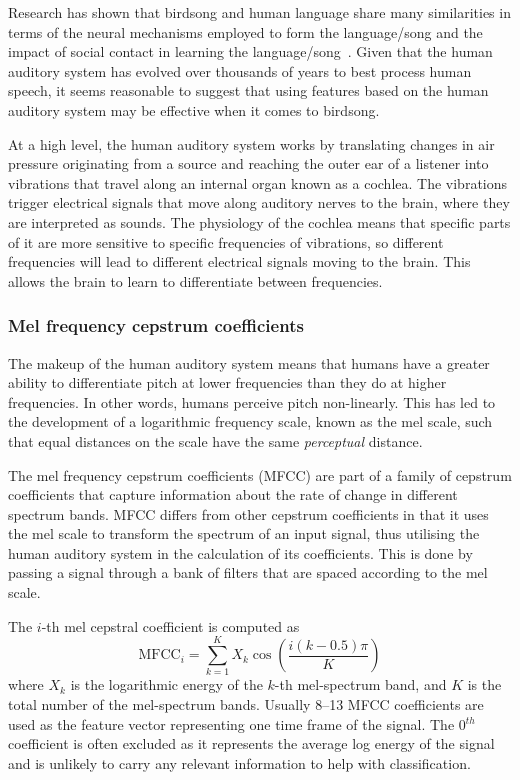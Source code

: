 Research has shown that birdsong and human language share many similarities in
terms of the neural mechanisms employed to form the language/song and the impact
of social contact in learning the language/song~\cite{birdsongspeech}. Given that
the human auditory system has evolved over thousands of years to best process
human speech, it seems reasonable to suggest that using features based on the
human auditory system may be effective when it comes to birdsong.

At a high level, the human auditory system works by translating changes in air
pressure originating from a source and reaching the outer ear of a listener
into vibrations that travel along an internal organ known as a cochlea. The
vibrations trigger electrical signals that move along auditory nerves to the
brain, where they are interpreted as sounds. The physiology of the cochlea
means that specific parts of it are more sensitive to specific frequencies
of vibrations, so different frequencies will lead to different electrical
signals moving to the brain. This allows the brain to learn to differentiate
between frequencies.

\subsubsection{Mel frequency cepstrum coefficients}

The makeup of the human auditory system means that humans have a greater ability
to differentiate pitch at lower frequencies than they do at higher frequencies.
In other words, humans perceive pitch non-linearly. This has led to the
development of a logarithmic frequency scale, known as the mel scale, such that
equal distances on the scale have the same \textit{perceptual} distance.

The mel frequency cepstrum coefficients (MFCC) are part of a family of cepstrum
coefficients that capture information about the rate of change in different
spectrum bands. MFCC differs from other cepstrum coefficients in that it uses the
mel scale to transform the spectrum of an input signal, thus utilising the human
auditory system in the calculation of its coefficients. This is done by passing
a signal through a bank of filters that are spaced according to the mel scale.

The $i$-th mel cepstral coefficient is computed as~\cite{davis1980comparison}
\begin{equation}
\text{MFCC}_i = \sum_{k=1}^{K} X_k \cos \left(
  \frac{i(k-0.5)\pi}{K}
\right)
\end{equation}
where $X_k$ is the logarithmic energy of the $k$-th mel-spectrum band, and $K$
is the total number of the mel-spectrum bands. Usually 8--13 MFCC coefficients
are used as the feature vector representing one time frame of the signal. The
0$^{th}$ coefficient is often excluded as it represents the average log energy
of the signal and is unlikely to carry any relevant information to help with
classification.


